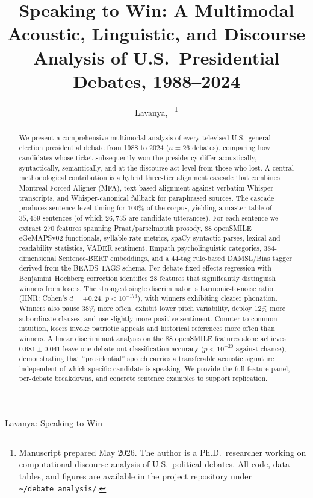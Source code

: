 \documentclass[journal]{IEEEtran}
\begin{document}
\title{Speaking to Win: A Multimodal Acoustic, Linguistic, and Discourse
       Analysis of U.S.\ Presidential Debates, 1988--2024}

\author{Lavanya,~%
\thanks{Manuscript prepared May 2026. The author is a Ph.D.\ researcher
working on computational discourse analysis of U.S.\ political debates.
All code, data tables, and figures are available in the project repository
under \texttt{\textasciitilde/debate\_analysis/}.}}

%
{Lavanya: Speaking to Win}

\maketitle

\begin{abstract}
We present a comprehensive multimodal analysis of every televised U.S.\
general-election presidential debate from 1988 to 2024 ($n = 26$ debates),
comparing how candidates whose ticket subsequently won the presidency differ
acoustically, syntactically, semantically, and at the discourse-act level
from those who lost. A central methodological contribution is a hybrid
three-tier alignment cascade that combines Montreal Forced Aligner (MFA),
text-based alignment against verbatim Whisper transcripts, and
Whisper-canonical fallback for paraphrased sources. The cascade produces
sentence-level timing for $100\%$ of the corpus, yielding a master table of
$35{,}459$ sentences (of which $26{,}735$ are candidate utterances). For each
sentence we extract $270$ features spanning Praat/parselmouth prosody,
$88$ openSMILE eGeMAPSv02 functionals, syllable-rate metrics, spaCy
syntactic parses, lexical and readability statistics, VADER sentiment,
Empath psycholinguistic categories, $384$-dimensional Sentence-BERT
embeddings, and a $44$-tag rule-based DAMSL/Bias tagger derived from the
BEADS-TAGS schema. Per-debate fixed-effects regression with
Benjamini--Hochberg correction identifies $28$ features that significantly
distinguish winners from losers. The strongest single discriminator is
harmonic-to-noise ratio (HNR; Cohen's $d = +0.24$, $p < 10^{-173}$), with
winners exhibiting clearer phonation. Winners also pause $38\%$ more
often, exhibit lower pitch variability, deploy $12\%$ more subordinate
clauses, and use slightly more positive sentiment. Counter to common
intuition, losers invoke patriotic appeals and historical references
more often than winners. A linear discriminant analysis on the $88$
openSMILE features alone achieves $0.681 \pm 0.041$ leave-one-debate-out
classification accuracy ($p < 10^{-20}$ against chance), demonstrating that
``presidential'' speech carries a transferable acoustic signature
independent of which specific candidate is speaking. We provide the full
feature panel, per-debate breakdowns, and concrete sentence examples
to support replication.
\end{abstract}
\end{document}
